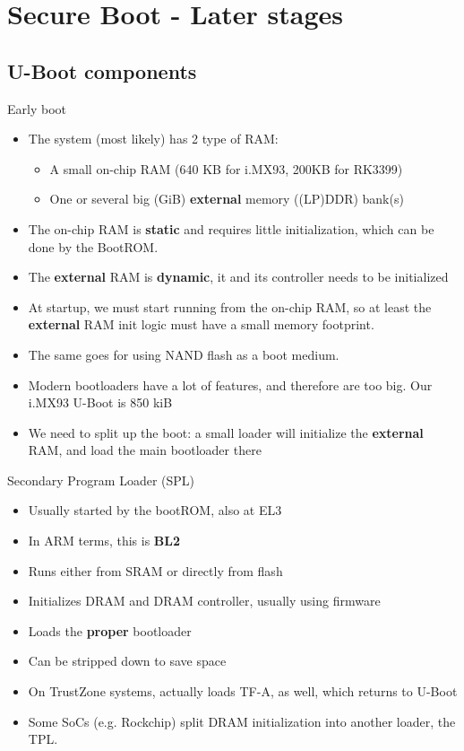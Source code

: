 \section{Secure Boot - Later stages}

\subsection{U-Boot components}

\begin{frame}{Early boot}
  \begin{itemize}
    \item The system (most likely) has 2 type of RAM:
    \begin{itemize}
      \item A small on-chip RAM (640 KB for i.MX93, 200KB for RK3399)
      \item One or several big (GiB) \textbf{external} memory ((LP)DDR) bank(s)
    \end{itemize}
    \item The on-chip RAM is \textbf{static} and requires little initialization, which can be
          done by the BootROM.
    \item The \textbf{external} RAM is \textbf{dynamic}, it and its controller needs to be initialized
    \item At startup, we must start running from the on-chip RAM, so at least the \textbf{external}
          RAM init logic must have a small memory footprint.
    \item The same goes for using NAND flash as a boot medium.
    \item Modern bootloaders have a lot of features, and therefore are too big.
          Our i.MX93 U-Boot is 850 kiB
    \item We need to split up the boot: a small loader will initialize the \textbf{external} RAM, and
          load the main bootloader there
  \end{itemize}
\end{frame}

\begin{frame}{Secondary Program Loader (SPL)}
  \begin{itemize}
    \item Usually started by the bootROM, also at EL3
    \item In ARM terms, this is \textbf{BL2}
    \item Runs either from SRAM or directly from flash
    \item Initializes DRAM and DRAM controller, usually using firmware
    \item Loads the \textbf{proper} bootloader
    \item Can be stripped down to save space
    \item On TrustZone systems, actually loads TF-A, as well, which returns to U-Boot
    \item Some SoCs (e.g. Rockchip) split DRAM initialization into another
          loader, the TPL.
  \end{itemize}
\end{frame}

